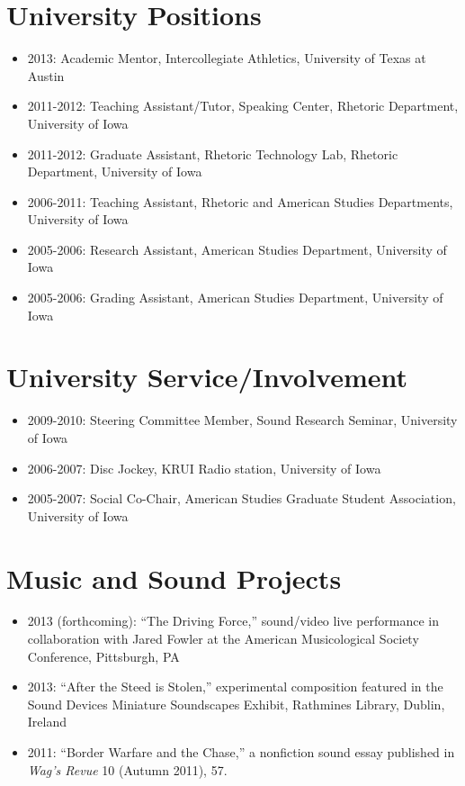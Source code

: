 \documentclass[11pt, a4paper]{article}
\begin{document}
\section{University Positions}

\begin{itemize}
\itemsep1pt\parskip0pt
\item
  2013: Academic Mentor, Intercollegiate Athletics, University of Texas
  at Austin
\item
  2011-2012: Teaching Assistant/Tutor, Speaking Center, Rhetoric
  Department, University of Iowa
\item
  2011-2012: Graduate Assistant, Rhetoric Technology Lab, Rhetoric
  Department, University of Iowa
\item
  2006-2011: Teaching Assistant, Rhetoric and American Studies
  Departments, University of Iowa
\item
  2005-2006: Research Assistant, American Studies Department, University
  of Iowa
\item
  2005-2006: Grading Assistant, American Studies Department, University
  of Iowa
\end{itemize}

\section{University Service/Involvement}

\begin{itemize}
\itemsep1pt\parskip0pt
\item
  2009-2010: Steering Committee Member, Sound Research Seminar,
  University of Iowa
\item
  2006-2007: Disc Jockey, KRUI Radio station, University of Iowa
\item
  2005-2007: Social Co-Chair, American Studies Graduate Student
  Association, University of Iowa
\end{itemize}

\section{Music and Sound Projects}

\begin{itemize}
\itemsep1pt\parskip0pt
\item
  2013 (forthcoming): ``The Driving Force,'' sound/video live
  performance in collaboration with Jared Fowler at the American
  Musicological Society Conference, Pittsburgh, PA
\item
  2013: ``After the Steed is Stolen,'' experimental composition featured
  in the Sound Devices Miniature Soundscapes Exhibit, Rathmines Library,
  Dublin, Ireland
\item
  2011: ``Border Warfare and the Chase,'' a nonfiction sound essay
  published in \emph{Wag's Revue} 10 (Autumn 2011), 57.
\end{itemize}
\end{document}
